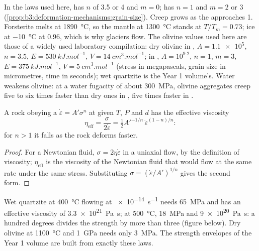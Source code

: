 In the laws used here,  has $n$ of 3.5 or 4 and $m = 0$;
 has $n = 1$ and $m = 2$ or 3 (\cref{prop:b3:deformation-mechanisms:grain-size}).
Creep grows as the  approaches 1. Forsterite melts at \qty{1890}{\celsius}, so the mantle at \qty{1300}{\celsius}
stands at $T/T_m = 0.73$; ice at \qty{-10}{\celsius} at 0.96, which is why
glaciers flow. The olivine values used here are those of a widely used
laboratory compilation: dry olivine in , $A =
\num{1.1e5}$, $n = 3.5$, $E = \qty{530}{kJ.mol^{-1}}$, $V =
\qty{14}{cm^3.mol^{-1}}$; in , $A = 10^{9.2}$, $n = 1$, $m = 3$,
$E = \qty{375}{kJ.mol^{-1}}$, $V = \qty{5}{cm^3.mol^{-1}}$ (stress in megapascals,
grain size in micrometres, time in seconds); wet quartzite is the Year 1
volume's. Water weakens olivine: at a water fugacity of about
\qty{300}{MPa}, olivine aggregates creep five to six times faster than dry ones
in , five times faster in .

\begin{proposition}\label{prop:b3:deformation-mechanisms:viscosity}
A rock obeying a  $\dot\varepsilon = A'\sigma^n$ at given $T$, $P$ and
$d$ has the effective viscosity
\[
  \eta_{\mathrm{eff}} = \frac{\sigma}{2\dot\varepsilon}
  = \tfrac12A'^{-1/n}\,\dot\varepsilon^{(1-n)/n}:
\]
for $n > 1$ it falls as the rock deforms faster.
\end{proposition}

\begin{proof}
For a Newtonian fluid, $\sigma = 2\eta\dot\varepsilon$ in a uniaxial flow, by the
definition of viscosity; $\eta_{\mathrm{eff}}$ is the viscosity of the Newtonian
fluid that would flow at the same rate under the same stress. Substituting
$\sigma = (\dot\varepsilon/A')^{1/n}$ gives the second form.
\end{proof}

Wet quartzite at \qty{400}{\celsius} flowing at \qty{e-14}{s^{-1}} needs
\qty{65}{MPa} and has an effective viscosity of \qty{3.3e21}{Pa.s}; at
\qty{500}{\celsius}, \qty{18}{MPa} and \qty{9e20}{Pa.s}: a hundred degrees
divides the strength by more than three (figure below). Dry olivine at
\qty{1100}{\celsius} and \qty{1}{GPa} needs only \qty{3}{MPa}. The strength
envelopes of the Year 1 volume are built from exactly these laws.

